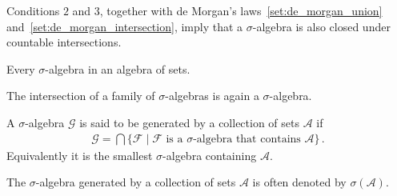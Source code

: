     \begin{remark}
        Conditions $2$ and $3$, together with de Morgan's laws~\eqref{set:de_morgan_union} and~\eqref{set:de_morgan_intersection}, imply that a $\sigma$-algebra is also closed under countable intersections.
    \end{remark}

    \begin{result}
        Every $\sigma$-algebra in an algebra of sets.
    \end{result}

    \begin{property}[Intersections]
        The intersection of a family of $\sigma$-algebras is again a $\sigma$-algebra.
    \end{property}

    \begin{definition}\label{set:generated_sigma_algebra}
        A $\sigma$-algebra $\mathcal{G}$ is said to be generated by a collection of sets $\mathcal{A}$ if
        \begin{gather}
            \mathcal{G} = \bigcap\{\mathcal{F}\mid\mathcal{F}\text{ is a } \sigma\text{-algebra that contains }\mathcal{A}\}\,.
        \end{gather}
        Equivalently it is the smallest $\sigma$-algebra containing $\mathcal{A}$.
    \end{definition}
    \begin{notation}\label{set:notation:generated_sigma_algebra}
        The $\sigma$-algebra generated by a collection of sets $\mathcal{A}$ is often denoted by $\sigma(\mathcal{A})$.
    \end{notation}

